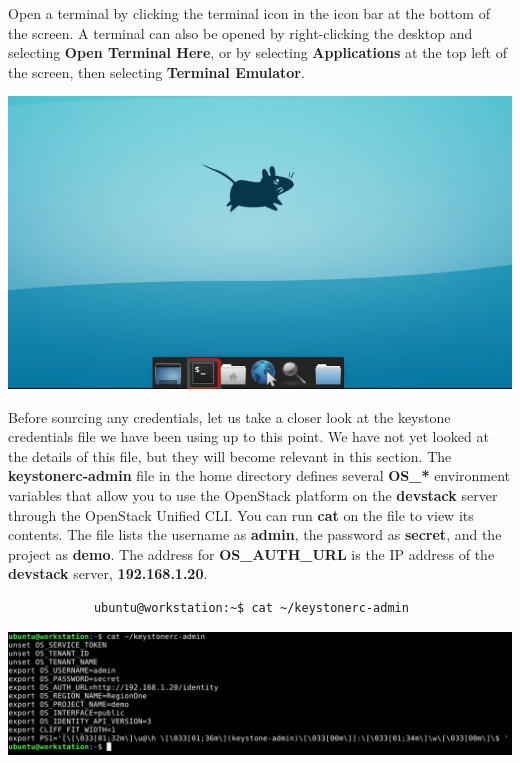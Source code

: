 \documentclass[letterpaper, 12pt]{article}
\begin{document}
\begin{enumerate}
    \begin{labstep}
        Open a terminal by clicking the terminal icon in the icon bar at the bottom of the screen.
        A terminal can also be opened by right-clicking the desktop and selecting \textbf{Open Terminal Here}, or by selecting \textbf{Applications} at the top left of the screen, then selecting \textbf{Terminal Emulator}.

        \begin{center}
            \includegraphics[width=\linewidth]{images/part2/step1.png}
        \end{center}
    \end{labstep}

    \begin{labstep}
        Before sourcing any credentials, let us take a closer look at the keystone credentials file we have been using up to this point.
        We have not yet looked at the details of this file, but they will become relevant in this section.
        The \textbf{keystonerc-admin} file in the home directory defines several \textbf{OS\_*} environment variables that allow you to use the OpenStack platform on the \textbf{devstack} server through the OpenStack Unified CLI.
        You can run \textbf{cat} on the file to view its contents.
        The file lists the username as \textbf{admin}, the password as \textbf{secret}, and the project as \textbf{demo}.
        The address for \textbf{OS\_AUTH\_URL} is the IP address of the \textbf{devstack} server, \textbf{192.168.1.20}.
        \begin{lstlisting}
            ubuntu@workstation:~$ cat ~/keystonerc-admin
        \end{lstlisting}

        \begin{center}
            \includegraphics[width=\linewidth]{images/part2/step2.png}
        \end{center}
    \end{labstep}


\end{enumerate}
\end{document}

